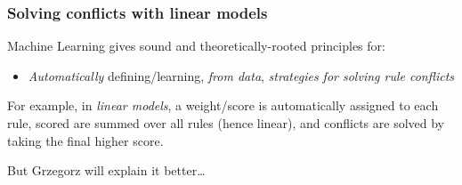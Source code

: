 \documentclass[usenames,dvipsnames]{beamer}
\newcommand{\voc}[1]{\emph{\color{ForestGreen}#1}}
\begin{document}
\begin{frame}\frametitle{Solving conflicts with linear models}

\begin{block}{Machine Learning gives sound and theoretically-rooted principles for:}
\begin{itemize}
\item \emph{Automatically} defining/learning, \voc{from data}, \voc{strategies for solving rule conflicts}
\end{itemize}
\end{block}

\vspace{0.4cm}
For example, in \voc{linear models}, a weight/score is automatically assigned to
each rule, scored are summed over all rules (hence linear), and
conflicts are solved by taking the final higher score.

\vspace{0.4cm}
\pause
But Grzegorz will explain it better\ldots
\end{frame}
\end{document}
